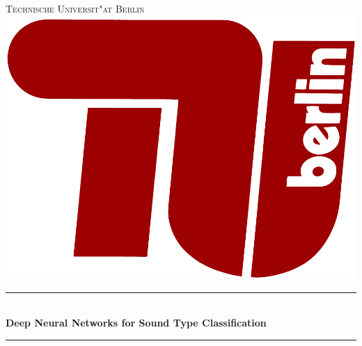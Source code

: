\documentclass[12pt,english,german,a4paper,twoside]{report}
\begin{document}
\begin{titlepage}
	
	\newcommand{\HRule}{\rule{\linewidth}{0.5mm}} %
	
	\centering %
	
	
	\textsc{\LARGE Technische Universit"at Berlin}\\[1.5cm] %
	{\includegraphics[scale=0.3]{tub.pdf}}
	
	\HRule \\[0.4cm]
	{ \huge \bfseries Deep Neural Networks for Sound Type Classification}\\[0.4cm] %
	\HRule \\[1.5cm]
	
	

\end{titlepage}
\end{document}
